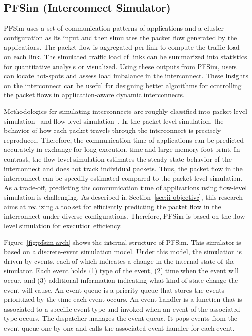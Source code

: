 \subsection{PFSim (Interconnect Simulator)}\label{sec:ii-pfsim}

PFSim uses a set of communication patterns of applications and a cluster
configuration as its input and then simulates the packet flow generated
by the applications. The packet flow is aggregated per link to compute
the traffic load on each link. The simulated traffic load of links can
be summarized into statistics for quantitative analysis or visualized.
Using these outputs from PFSim, users can locate hot-spots and assess
load imbalance in the interconnect. These insights on the interconnect
can be useful for designing better algorithms for controlling the packet
flows in application-aware dynamic interconnects.

Methodologies for simulating interconnects are roughly classified into
packet-level simulation~\cite{Hoefler2010} and flow-level
simulation~\cite{Schneider2009}. In the packet-level simulation, the behavior
of how each packet travels through the interconnect is precisely reproduced.
Therefore, the communication time of applications can be predicted accurately
in exchange for long execution time and large memory foot print. In contrast,
the flow-level simulation estimates the steady state behavior of the
interconnect and does not track individual packets. Thus, the packet flow in
the interconnect can be speedily estimated compared to the packet-level
simulation. As a trade-off, predicting the communication time of applications
using flow-level simulation is challenging. As described in
Section~\ref{sec:ii-objective}, this research aims at realizing a toolset for
efficiently predicting the packet flow in the interconnect under diverse
configurations. Therefore, PFSim is based on the flow-level simulation for
execution efficiency.

Figure~\ref{fig:pfsim-arch} shows the internal structure of PFSim. This
simulator is based on a discrete-event simulation model. Under this model, the
simulation is driven by events, each of which indicates a change in the
internal state of the simulator. Each event holds (1) type of the event, (2)
time when the event will occur, and (3) additional information indicating what
kind of state change the event will cause. An event queue is a priority queue
that stores the events prioritized by the time each event occurs. An event
handler is a function that is associated to a specific event type and invoked
when an event of the associated type occurs. The dispatcher manages the event
queue. It pops events from the event queue one by one and calls the associated
event handler for each event.

